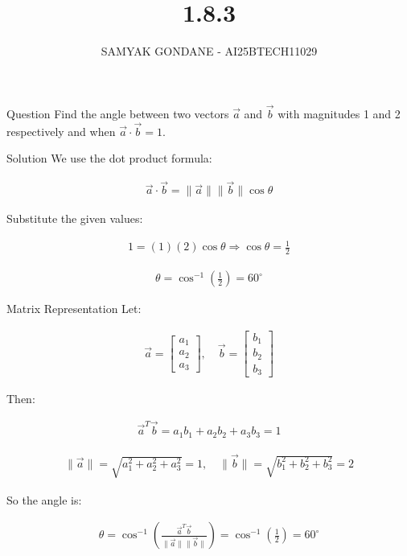\documentclass{beamer}
\title 
{1.8.3}
\date{}
\author
{SAMYAK GONDANE - AI25BTECH11029}
\begin{document}
\frame{\titlepage}

\begin{frame}{Question}
Find the angle between two vectors $\vec{a}$ and $\vec{b}$ with magnitudes 1 and 2 respectively and when $\vec{a} \cdot \vec{b} = 1$.
\end{frame}

\begin{frame}{Solution}
We use the dot product formula:


\begin{align}
\vec{a} \cdot \vec{b} = \|\vec{a}\| \|\vec{b}\| \cos\theta
\end{align}


Substitute the given values:


\begin{align}
1 = (1)(2)\cos\theta \Rightarrow \cos\theta = \frac{1}{2}
\end{align}




\begin{align}
\theta = \cos^{-1}\left(\frac{1}{2}\right) = 60^\circ
\end{align}


\end{frame}

\begin{frame}{Matrix Representation}
Let:


\begin{align}
\vec{a} = \begin{bmatrix} a_1 \\ a_2 \\ a_3 \end{bmatrix}, \quad
\vec{b} = \begin{bmatrix} b_1 \\ b_2 \\ b_3 \end{bmatrix}
\end{align}


Then:


\begin{align}
\vec{a}^T \vec{b} = a_1b_1 + a_2b_2 + a_3b_3 = 1
\end{align}




\begin{align}
\|\vec{a}\| = \sqrt{a_1^2 + a_2^2 + a_3^2} = 1, \quad
\|\vec{b}\| = \sqrt{b_1^2 + b_2^2 + b_3^2} = 2
\end{align}


So the angle is:


\begin{align}
\theta = \cos^{-1}\left(\frac{\vec{a}^T \vec{b}}{\|\vec{a}\| \|\vec{b}\|}\right)
= \cos^{-1}\left(\frac{1}{2}\right) = 60^\circ
\end{align}


\end{frame}
\end{document}
